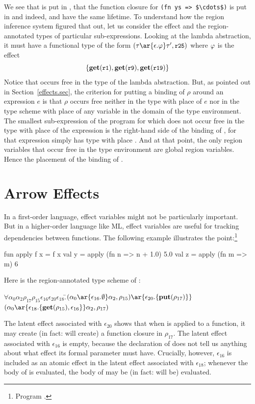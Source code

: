 \documentclass[12pt]{book}
\begin{document}
We see that  is put in , that the function closure for
\lstinline!(fn ys => $\cdots$)! is put in  and indeed,  and
 have the same lifetime. To understand how the region inference system
figured that out, let us consider the effect and the region-annotated types of
particular sub-expressions. Looking at the lambda abstraction, it must have a
functional type of the form $(\tau\ar{\epsilon.\rea}\tau', \kw{r25})$ where
$\varphi$ is the effect
$$\{\mathop{\bf get}\nolimits(\mbox{\small\ttfamily r1}), \mathop{\bf get}\nolimits(\mbox{\small\ttfamily r9}), \mathop{\bf get}\nolimits(\mbox{\small\ttfamily r19})\}$$ Notice that 
occurs free in the type of the lambda abstraction.  But, as pointed out in
Section~\ref{effects.sec}, the criterion
%
%
%
for putting a  binding of $\rho$ around an expression $e$ is that
$\rho$ occurs free neither in the type with place of $e$ nor in the type scheme
with place of any variable in the domain of the type environment. The smallest
sub-expression of the program for which  does not occur free in the
type with place of the expression is the right-hand side of the  binding
of , for that expression simply has type with place .  And at that
point, the only region variables that occur free in the type environment are
global region variables.  Hence the placement of the  binding of
.

\section{Arrow Effects}

In a first-order language, effect variables might not be particularly important.
But in a higher-order language like ML, effect variables are useful for tracking
dependencies between functions. The following example illustrates the
point:\footnote{Program .}
\begin{smlcode}
  fun apply f x = f x
  val y = apply (fn n => n + 1.0) 5.0
  val z = apply (fn m => m) 6
\end{smlcode}
Here is the region-annotated type scheme of :
\begin{tabbing}
\qquad$\forall\alpha_0\alpha_2\rho_{17}\rho_{15}\epsilon_{16}\epsilon_{20}\epsilon_{18}.$\=$(\alpha_0
        \ar{\epsilon_{16}.\emptyset}\alpha_2,\rho_{15})\ar{\epsilon_{20}.\{\Put(\rho_{17})\}}$\\
            \>$(\alpha_0\ar{\epsilon_{18}.\{\Get(\rho_{15}), \epsilon_{16}\}}\alpha_2,\rho_{17})$
\end{tabbing}
The latent effect associated with $\epsilon_{20}$ shows that when  is
applied to a function, it may create (in fact: will create) a function closure
in $\rho_{17}$.  The latent effect associated with $\epsilon_{16}$ is empty,
because the declaration of  does not tell us anything about what
effect its formal parameter  must have. Crucially, however,
$\epsilon_{16}$ is included as an atomic effect in the latent effect associated
with $\epsilon_{18}$; whenever the body of  is evaluated, the body
of  may be (in fact: will be) evaluated.
\end{document}
